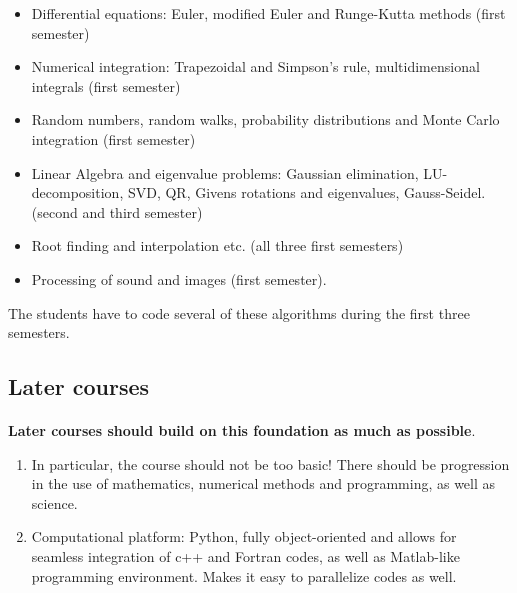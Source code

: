 \documentclass[%
twoside,                 %
final,                   %
10pt]{article}
\begin{document}
\begin{itemize}
\item Differential equations: Euler, modified Euler and Runge-Kutta methods (first semester)

\item Numerical integration: Trapezoidal and Simpson's rule, multidimensional integrals (first semester)

\item Random numbers, random walks, probability distributions and Monte Carlo integration  (first semester)

\item Linear Algebra and eigenvalue problems: Gaussian elimination, LU-decomposition, SVD, QR, Givens rotations and eigenvalues, Gauss-Seidel. (second and third semester)

\item Root finding and interpolation etc. (all three first semesters)

\item Processing of sound and images (first semester).
\end{itemize}

\noindent
The students have to code several of these algorithms during the first three semesters.




\subsection*{Later courses}

\paragraph{}

\textbf{Later courses should build on this foundation as much as possible}.

\begin{enumerate}
\item In particular, the course should not be too basic! There should be progression in the use of mathematics, numerical methods and programming, as well as science.

\item Computational platform: Python, fully object-oriented and allows for seamless integration of c++ and Fortran codes, as well as Matlab-like programming environment. Makes it easy to parallelize codes as well.
\end{enumerate}
\end{document}
